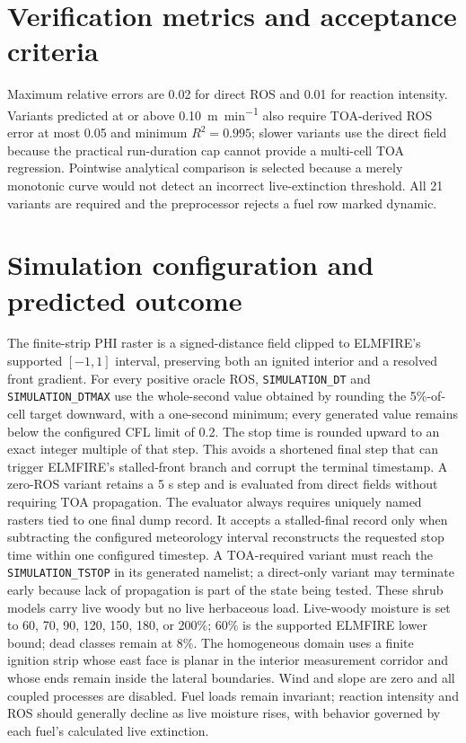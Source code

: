 \section{Verification metrics and acceptance criteria}
Maximum relative errors are 0.02 for direct ROS and 0.01 for reaction intensity.  Variants predicted at or above \SI{0.10}{m.min^{-1}} also require TOA-derived ROS error at most 0.05 and minimum $R^2=0.995$; slower variants use the direct field because the practical run-duration cap cannot provide a multi-cell TOA regression.  Pointwise analytical comparison is selected because a merely monotonic curve would not detect an incorrect live-extinction threshold.  All 21 variants are required and the preprocessor rejects a fuel row marked dynamic.

\section{Simulation configuration and predicted outcome}

The finite-strip PHI raster is a signed-distance field clipped to ELMFIRE's supported $[-1,1]$ interval, preserving both an ignited interior and a resolved front gradient. For every positive oracle ROS, \texttt{SIMULATION\_DT} and \texttt{SIMULATION\_DTMAX} use the whole-second value obtained by rounding the 5\%-of-cell target downward, with a one-second minimum; every generated value remains below the configured CFL limit of 0.2. The stop time is rounded upward to an exact integer multiple of that step. This avoids a shortened final step that can trigger ELMFIRE's stalled-front branch and corrupt the terminal timestamp. A zero-ROS variant retains a 5 s step and is evaluated from direct fields without requiring TOA propagation. The evaluator always requires uniquely named rasters tied to one final dump record. It accepts a stalled-final record only when subtracting the configured meteorology interval reconstructs the requested stop time within one configured timestep. A TOA-required variant must reach the \texttt{SIMULATION\_TSTOP} in its generated namelist; a direct-only variant may terminate early because lack of propagation is part of the state being tested.
These shrub models carry live woody but no live herbaceous load. Live-woody moisture is set to 60, 70, 90, 120, 150, 180, or 200\%; 60\% is the supported ELMFIRE lower bound; dead classes remain at 8\%.  The homogeneous domain uses a finite ignition strip whose east face is planar in the interior measurement corridor and whose ends remain inside the lateral boundaries.  Wind and slope are zero and all coupled processes are disabled.  Fuel loads remain invariant; reaction intensity and ROS should generally decline as live moisture rises, with behavior governed by each fuel's calculated live extinction.

